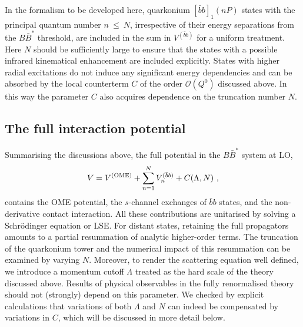 \documentclass[aps,prd,showpacs,amsmath,twocolumn,superscriptaddress,floatfix,nofootinbib,notitlepage]{revtex4-2}
\newcommand{\bbnP}{[\bar{b}b]_1(nP)}
\newcommand{\be}{\begin{equation}}
\newcommand{\ee}{\end{equation}}
\newcommand{\QQ}{\bar{b}b}
\newcommand{\VQQ}{V^{(\bar{b}b)}}
\newcommand{\VOME}{V^{\rm (OME)}}
\begin{document}
In the formalism to be developed here, 
quarkonium $\bbnP$ states with the principal quantum number $n~\leqslant~N$, irrespective of their energy separations from the $B\bar{B}^*$ threshold, are included in the sum in $\VQQ$ for a uniform treatment. Here $N$ should be sufficiently large to ensure that the states with a possible infrared kinematical enhancement are included explicitly. 
States with higher radial excitations do not induce any significant energy dependencies and can be absorbed by the local counterterm $C$ of the order $\mathcal{O}(Q^0)$ discussed above. 
In this way the parameter $C$ also acquires dependence on the truncation number $N$. 

\subsection{The full interaction potential}
\label{sec:fullpotential}

Summarising the discussions above, the full potential in the $B\bar{B}^*$ system at LO,
\be
V=\VOME+\sum_{n=1}^N \VQQ_n+C(\Lambda,N)\ ,
\label{Vdef}
\ee
contains the OME potential,
the $s$-channel exchanges of $\QQ$ states,
and the non-derivative contact interaction.
All these contributions are unitarised by solving a Schr{\"o}dinger equation or LSE. For distant states, retaining the full propagators amounts to a partial resummation of analytic higher-order terms. 
The truncation of the quarkonium tower and the numerical impact of this resummation can be examined by varying $N$.
Moreover, to render the scattering equation well defined, we introduce a momentum cutoff $\Lambda$ treated as the hard scale of the theory discussed above.
Results of physical observables in the fully renormalised theory should not (strongly) depend on this parameter. We checked by explicit calculations that variations of both $\Lambda$ and $N$ can indeed be compensated by variations in $C$, which will be discussed in more detail below.
\end{document}
